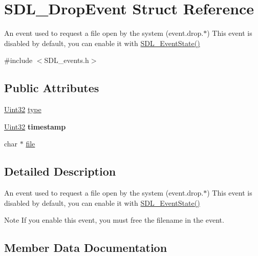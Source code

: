 \hypertarget{struct_s_d_l___drop_event}{}\section{S\+D\+L\+\_\+\+Drop\+Event Struct Reference}
\label{struct_s_d_l___drop_event}


An event used to request a file open by the system (event.\+drop.$\ast$) This event is disabled by default, you can enable it with \hyperlink{_s_d_l__events_8h_afb772893e1c46f186fa39a4defe76df3}{S\+D\+L\+\_\+\+Event\+State()}  




{\ttfamily \#include $<$S\+D\+L\+\_\+events.\+h$>$}

\subsection*{Public Attributes}
\begin{DoxyCompactItemize}
\item 
\hyperlink{_s_d_l__stdinc_8h_add440eff171ea5f55cb00c4a9ab8672d}{Uint32} \hyperlink{struct_s_d_l___drop_event_a5ea27cfaa5f8d4940e9a69b68b3cc035}{type}
\item 
\hypertarget{struct_s_d_l___drop_event_a02d2c81bb22db632a40cd0021ff751ab}{}\hyperlink{_s_d_l__stdinc_8h_add440eff171ea5f55cb00c4a9ab8672d}{Uint32} {\bfseries timestamp}\label{struct_s_d_l___drop_event_a02d2c81bb22db632a40cd0021ff751ab}

\item 
char $\ast$ \hyperlink{struct_s_d_l___drop_event_abc41ef4beb62e1d8b56827128b29585f}{file}
\end{DoxyCompactItemize}


\subsection{Detailed Description}
An event used to request a file open by the system (event.\+drop.$\ast$) This event is disabled by default, you can enable it with \hyperlink{_s_d_l__events_8h_afb772893e1c46f186fa39a4defe76df3}{S\+D\+L\+\_\+\+Event\+State()} 

\begin{DoxyNote}{Note}
If you enable this event, you must free the filename in the event. 
\end{DoxyNote}


\subsection{Member Data Documentation}
\hypertarget{struct_s_d_l___drop_event_abc41ef4beb62e1d8b56827128b29585f}{}
